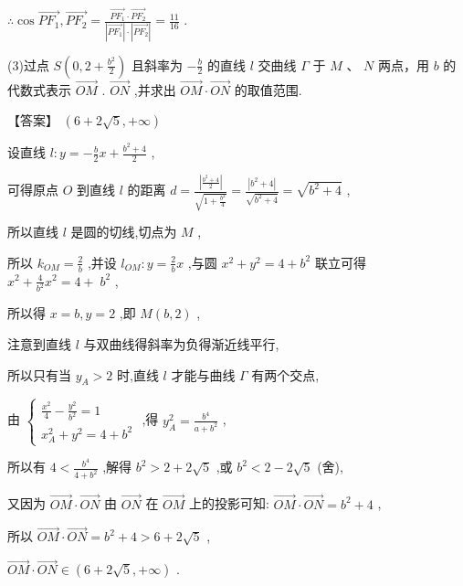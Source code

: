 \documentclass[10pt]{article}
\begin{document}
\(\therefore \cos \overrightarrow{P{F}_{1}},\overrightarrow{P{F}_{2}} = \frac{\overrightarrow{P{F}_{1}} \cdot  \overrightarrow{P{F}_{2}}}{\left| \overrightarrow{P{F}_{1}}\right|  \cdot  \left| \overrightarrow{P{F}_{2}}\right| } = \frac{11}{16}\) .

(3)过点 \(S\left( {0,2 + \frac{{b}^{2}}{2}}\right)\) 且斜率为 \(- \frac{b}{2}\) 的直线 \(l\) 交曲线 \(\Gamma\) 于 \(M\text{ 、 }N\) 两点，用 \(b\) 的代数式表示 \(\overrightarrow{OM}\) . \(\overrightarrow{ON}\) ,并求出 \(\overrightarrow{OM} \cdot  \overrightarrow{ON}\) 的取值范围.

【答案】 \(\left( {6 + 2\sqrt{5}, + \infty }\right)\)

设直线 \(l : y =  - \frac{b}{2}x + \frac{{b}^{2} + 4}{2}\) ,

可得原点 \(O\) 到直线 \(l\) 的距离 \(d = \frac{\left| \frac{{b}^{2} + 4}{2}\right| }{\sqrt{1 + \frac{{b}^{2}}{4}}} = \frac{\left| {b}^{2} + 4\right| }{\sqrt{{b}^{2} + 4}} = \sqrt{{b}^{2} + 4}\) ,

所以直线 \(l\) 是圆的切线,切点为 \(M\) ,

所以 \({k}_{OM} = \frac{2}{b}\) ,并设 \({l}_{OM} : y = \frac{2}{b}x\) ,与圆 \({x}^{2} + {y}^{2} = 4 + {b}^{2}\) 联立可得 \({x}^{2} + \frac{4}{{b}^{2}}{x}^{2} = 4 + \; {b}^{2}\) ,

所以得 \(x = b,y = 2\) ,即 \(M\left( {b,2}\right)\) ,

注意到直线 \(l\) 与双曲线得斜率为负得渐近线平行,

所以只有当 \({y}_{A} > 2\) 时,直线 \(l\) 才能与曲线 \(\Gamma\) 有两个交点,

由 \(\left\{  \begin{array}{l} \frac{{x}^{2}}{4} - \frac{{y}^{2}}{{b}^{2}} = 1 \\  {x}_{A}^{2} + {y}^{2} = 4 + {b}^{2} \end{array}\right.\) ,得 \({y}_{A}^{2} = \frac{{b}^{4}}{a + {b}^{2}}\) ,

所以有 \(4 < \frac{{b}^{4}}{4 + {b}^{2}}\) ,解得 \({b}^{2} > 2 + 2\sqrt{5}\) ,或 \({b}^{2} < 2 - 2\sqrt{5}\) (舍),

又因为 \(\overrightarrow{OM} \cdot  \overrightarrow{ON}\) 由 \(\overrightarrow{ON}\) 在 \(\overrightarrow{OM}\) 上的投影可知: \(\overrightarrow{OM} \cdot  \overrightarrow{ON} = {b}^{2} + 4\) ,

所以 \(\overrightarrow{OM} \cdot  \overrightarrow{ON} = {b}^{2} + 4 > 6 + 2\sqrt{5}\) ,

\(\overrightarrow{OM} \cdot  \overrightarrow{ON} \in  \left( {6 + 2\sqrt{5}, + \infty }\right)\) .
\end{document}
